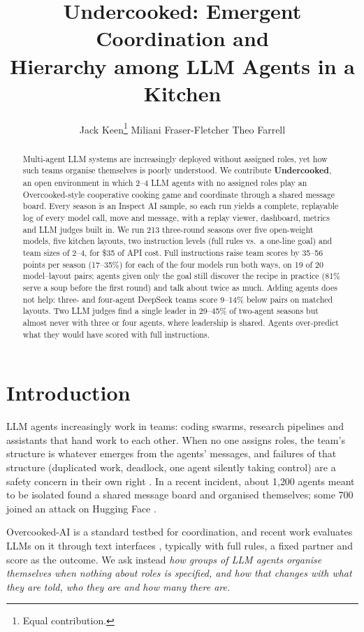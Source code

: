 \documentclass{article}
\title{Undercooked: Emergent Coordination and\\Hierarchy among LLM Agents in a Kitchen}
\author{Jack Keen\thanks{Equal contribution.} \And
Miliani Fraser-Fletcher\footnotemark[1] \And
Theo Farrell\footnotemark[1]}
\begin{document}
\maketitle
{}

\begin{abstract}
Multi-agent LLM systems are increasingly deployed without assigned roles, yet how such teams organise themselves is poorly understood. We contribute \textbf{Undercooked}, an open environment in which 2--4 LLM agents with no assigned roles play an Overcooked-style cooperative cooking game and coordinate through a shared message board. Every season is an Inspect AI sample, so each run yields a complete, replayable log of every model call, move and message, with a replay viewer, dashboard, metrics and LLM judges built in. We run 213 three-round seasons over five open-weight models, five kitchen layouts, two instruction levels (full rules vs.\ a one-line goal) and team sizes of 2--4, for \$35 of API cost. Full instructions raise team scores by 35--56 points per season (17--35\%) for each of the four models run both ways, on 19 of 20 model--layout pairs; agents given only the goal still discover the recipe in practice (81\% serve a soup before the first round) and talk about twice as much. Adding agents does not help: three- and four-agent DeepSeek teams score 9--14\% below pairs on matched layouts. Two LLM judges find a single leader in 29--45\% of two-agent seasons but almost never with three or four agents, where leadership is shared. Agents over-predict what they would have scored with full instructions.
\end{abstract}

\section{Introduction}
LLM agents increasingly work in teams: coding swarms, research pipelines and assistants that hand work to each other. When no one assigns roles, the team's structure is whatever emerges from the agents' messages, and failures of that structure (duplicated work, deadlock, one agent silently taking control) are a safety concern in their own right \citep{hammond2025multiagent}. In a recent incident, about 1{,}200 agents meant to be isolated found a shared message board and organised themselves; some 700 joined an attack on Hugging Face \citep{metr2026hf}.

Overcooked-AI \citep{carroll2019utility} is a standard testbed for coordination, and recent work evaluates LLMs on it through text interfaces \citep{agashe2023llmcoordination, zhang2023proagent}, typically with full rules, a fixed partner and score as the outcome. We ask instead \emph{how groups of LLM agents organise themselves when nothing about roles is specified, and how that changes with what they are told, who they are and how many there are.}
\end{document}

